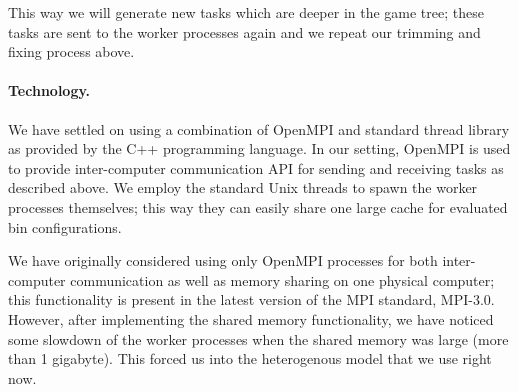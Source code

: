 This way we will generate new tasks which are deeper in the game tree;
these tasks are sent to the worker processes again and we repeat our
trimming and fixing process above.

\paragraph{Technology.} We have settled on using a combination of
OpenMPI \cite{openmpi} and standard thread library as provided by the
C++ programming language. In our setting, OpenMPI is used to provide
inter-computer communication API for sending and receiving tasks as
described above. We employ the standard Unix threads to spawn the
worker processes themselves; this way they can easily share one large
cache for evaluated bin configurations.

We have originally considered using only OpenMPI processes for both
inter-computer communication as well as memory sharing on one physical
computer; this functionality is present in the latest version of the
MPI standard, MPI-3.0. However, after implementing the shared memory
functionality, we have noticed some slowdown of the worker processes
when the shared memory was large (more than 1 gigabyte). This forced
us into the heterogenous model that we use right now.


